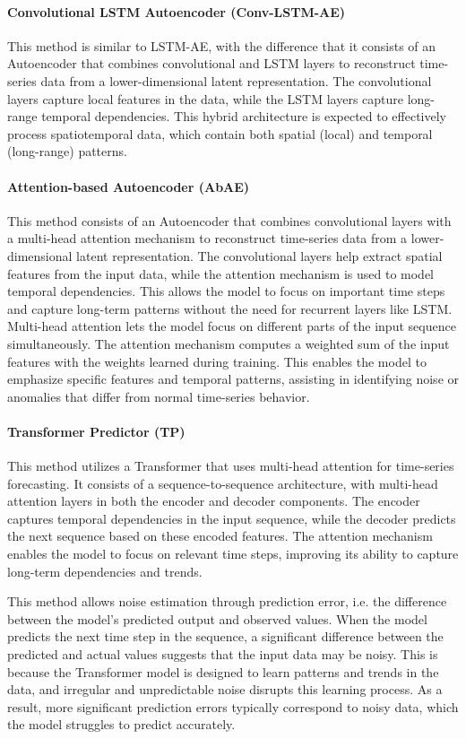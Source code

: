 \documentclass[conference]{IEEEtran}
\begin{document}
\paragraph{Convolutional LSTM Autoencoder (Conv-LSTM-AE)} This method is similar to LSTM-AE, with the difference that it consists of an Autoencoder that combines convolutional and LSTM layers to reconstruct time-series data from a lower-dimensional latent representation. The convolutional layers capture local features in the data, while the LSTM layers capture long-range temporal dependencies. This hybrid architecture is expected to effectively process spatiotemporal data, which contain both spatial (local) and temporal (long-range) patterns.
\paragraph{Attention-based Autoencoder (AbAE)} This method consists of an Autoencoder that combines convolutional layers with a multi-head attention mechanism to reconstruct time-series data from a lower-dimensional latent representation. The convolutional layers help extract spatial features from the input data, while the attention mechanism is used to model temporal dependencies. This allows the model to focus on important time steps and capture long-term patterns without the need for recurrent layers like LSTM. Multi-head attention lets the model focus on different parts of the input sequence simultaneously. The attention mechanism computes a weighted sum of the input features with the weights learned during training. This enables the model to emphasize specific features and temporal patterns, assisting in identifying noise or anomalies that differ from normal time-series behavior.
\paragraph{Transformer Predictor (TP)} This method utilizes a  Transformer that uses multi-head attention for time-series forecasting. It consists of a sequence-to-sequence architecture, with multi-head attention layers in both the encoder and decoder components. The encoder captures temporal dependencies in the input sequence, while the decoder predicts the next sequence based on these encoded features. The attention mechanism enables the model to focus on relevant time steps, improving its ability to capture long-term dependencies and trends.

This method allows noise estimation through prediction error, i.e. the difference between the model’s predicted output and observed values. When the model predicts the next time step in the sequence, a significant difference between the predicted and actual values suggests that the input data may be noisy. This is because the Transformer model is designed to learn patterns and trends in the data, and irregular and unpredictable noise disrupts this learning process. As a result, more significant prediction errors typically correspond to noisy data, which the model struggles to predict accurately.
\end{document}
